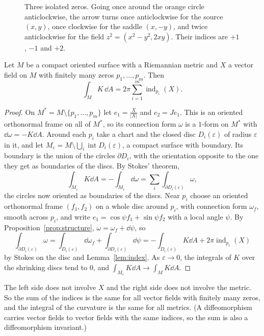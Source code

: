 \begin{figure}[ht]
\centering
{}
\caption{Three isolated zeros. Going once around the orange circle anticlockwise, the arrow turns once anticlockwise for the source $(x,y)$, once
clockwise for the saddle $(x,-y)$, and twice anticlockwise for the field $z^2=(x^2-y^2,2xy)$. Their indices are $+1$, $-1$ and $+2$.}
\label{fig:index}
\end{figure}

\begin{theorem}\label{thm:gaussbonnet}
Let $M$ be a compact oriented surface with a Riemannian metric and $X$ a vector field on $M$ with finitely many zeros $p_1,\dots,p_m$. Then
\[
\int_MK\,\dd A=2\pi\sum_{i=1}^m\operatorname{ind}_{p_i}(X).
\]
\end{theorem}
\begin{proof}
On $M^*=M\setminus\{p_1,\dots,p_m\}$ let $e_1=\frac X{|X|}$ and $e_2=Je_1$. This is an oriented orthonormal frame on all of $M^*$, so its connection form $\omega$ is a $1$-form
on $M^*$ with $\dd\omega=-K\dd A$. Around each $p_i$ take a chart and the closed disc $D_i(\varepsilon)$ of radius $\varepsilon$ in it, and let $M_\varepsilon=M\setminus\bigcup_i\operatorname{int}D_i(\varepsilon)$, a compact
surface with boundary. Its boundary is the union of the circles $\partial D_i$, with the orientation opposite to the one they get as boundaries of the discs.
By Stokes' theorem,
\[
\int_{M_\varepsilon}K\dd A=-\int_{M_\varepsilon}\dd\omega=\sum_i\int_{\partial D_i(\varepsilon)}\omega,
\]
the circles now oriented as boundaries of the discs. Near $p_i$ choose an oriented orthonormal frame $(f_1,f_2)$ on a whole disc around $p_i$, with connection form
$\omega_f$, smooth across $p_i$, and write $e_1=\cos\psi f_1+\sin\psi f_2$ with a local angle $\psi$. By Proposition~\ref{prop:structure}, $\omega=\omega_f+\dd\psi$, so
\[
\int_{\partial D_i(\varepsilon)}\omega=\int_{D_i(\varepsilon)}\dd\omega_f+\int_{\partial D_i(\varepsilon)}\dd\psi=-\int_{D_i(\varepsilon)}K\dd A+2\pi\operatorname{ind}_{p_i}(X)
\]
by Stokes on the disc and Lemma~\ref{lem:index}. As $\varepsilon\to0$, the integrals of $K$ over the shrinking discs tend to $0$, and $\int_{M_\varepsilon}K\dd A\to\int_MK\dd A$.
\end{proof}

The left side does not involve $X$ and the right side does not involve the metric. So the sum of the indices is the same for all vector fields with finitely many
zeros, and the integral of the curvature is the same for all metrics. (A diffeomorphism carries vector fields to vector fields with the same indices, so the
sum is also a diffeomorphism invariant.)

